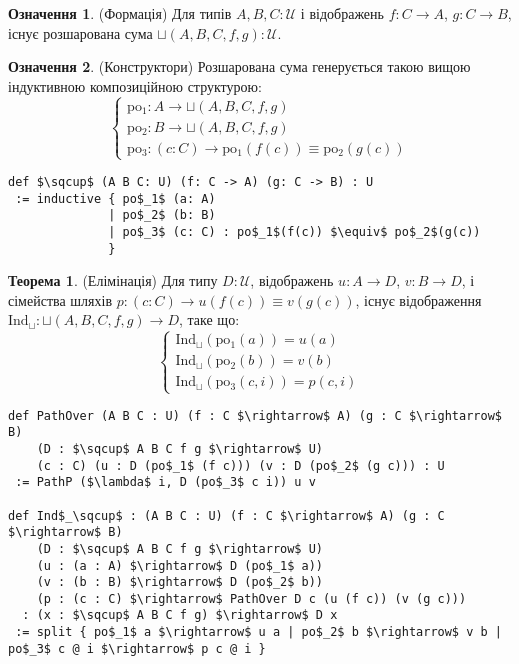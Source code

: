 \documentclass{article}
\theoremstyle{definition}
\newtheorem{theorem}{Теорема}
\newtheorem{definition}{Означення}
\begin{document}
\begin{definition} (Формація)
Для типів \( A, B, C : \mathcal{U} \) і відображень \( f : C \to A \), \( g : C \to B \),
існує розшарована сума \( \sqcup(A,B,C,f,g) : \mathcal{U} \).
\end{definition}

\begin{definition} (Конструктори)
Розшарована сума генерується такою вищою індуктивною композиційною структурою:
\[
\begin{cases}
\text{po$_1$} : A \to \sqcup(A,B,C,f,g) \\
\text{po$_2$} : B \to \sqcup(A,B,C,f,g) \\
\text{po$_3$} : (c : C) \to \text{po$_1$}(f(c)) \equiv \text{po$_2$}(g(c))
\end{cases}
\]
\begin{lstlisting}[mathescape=true]
def $\sqcup$ (A B C: U) (f: C -> A) (g: C -> B) : U
 := inductive { po$_1$ (a: A)
              | po$_2$ (b: B)
              | po$_3$ (c: C) : po$_1$(f(c)) $\equiv$ po$_2$(g(c))
              }
\end{lstlisting}
\end{definition}

\begin{theorem} (Елімінація)
Для типу \( D : \mathcal{U} \), відображень \( u : A \to D \), \( v : B \to D \),
і сімейства шляхів \( p : (c : C) \to u(f(c)) \equiv v(g(c)) \),
існує відображення \( \text{Ind}_\sqcup : \sqcup(A,B,C,f,g) \to D \), таке що:
\[
\begin{cases}
\text{Ind}_\sqcup(\text{po$_1$}(a)) = u(a) \\
\text{Ind}_\sqcup(\text{po$_2$}(b)) = v(b) \\
\text{Ind}_\sqcup(\text{po$_3$}(c,i)) = p(c,i)
\end{cases}
\]
\begin{lstlisting}[mathescape=true]
def PathOver (A B C : U) (f : C $\rightarrow$ A) (g : C $\rightarrow$ B)
    (D : $\sqcup$ A B C f g $\rightarrow$ U)
    (c : C) (u : D (po$_1$ (f c))) (v : D (po$_2$ (g c))) : U
 := PathP ($\lambda$ i, D (po$_3$ c i)) u v

def Ind$_\sqcup$ : (A B C : U) (f : C $\rightarrow$ A) (g : C $\rightarrow$ B)
    (D : $\sqcup$ A B C f g $\rightarrow$ U)
    (u : (a : A) $\rightarrow$ D (po$_1$ a))
    (v : (b : B) $\rightarrow$ D (po$_2$ b))
    (p : (c : C) $\rightarrow$ PathOver D c (u (f c)) (v (g c)))
  : (x : $\sqcup$ A B C f g) $\rightarrow$ D x
 := split { po$_1$ a $\rightarrow$ u a | po$_2$ b $\rightarrow$ v b | po$_3$ c @ i $\rightarrow$ p c @ i }
\end{lstlisting}
\end{theorem}
\end{document}
